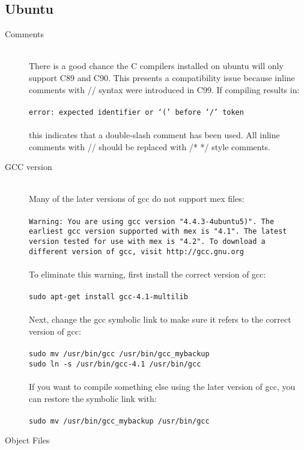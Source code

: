 \documentclass{article}
\begin{document}
\subsection{Ubuntu}
\begin{description}
\item[Comments] \hfill \\
There is a good chance the C compilers installed on ubuntu will only support C89 and C90. This presents a compatibility issue because inline comments with // syntax were introduced in C99. If compiling results in:\\
\\
\texttt{error: expected identifier or ‘(’ before ‘/’ token\\}
\\
this indicates that a double-slash comment has been used. All inline comments with // should be replaced with /*  */ style comments.\\
\item[GCC version] \hfill \\
Many of the later versions of gcc do not support mex files:\\
\\
\texttt{Warning: You are using gcc version "4.4.3-4ubuntu5)". The earliest gcc version supported
with mex is "4.1". The latest version tested for use with mex is "4.2".
To download a different version of gcc, visit http://gcc.gnu.org}\\
\\
To eliminate this warning, first install the correct version of gcc:\\
\\
\texttt{sudo apt-get install gcc-4.1-multilib}\\
\\
Next, change the gcc symbolic link to make sure it refers to the correct version of gcc:\\
\\
\texttt{sudo mv /usr/bin/gcc /usr/bin/gcc\_mybackup}\\
\texttt{sudo ln -s /usr/bin/gcc-4.1 /usr/bin/gcc}\\
\\
If you want to compile something else using the later version of gcc, you can restore the symbolic link with:\\
\\
\texttt{sudo mv /usr/bin/gcc\_mybackup /usr/bin/gcc}\\
\item[Object Files] \hfill \\

\end{description}
\end{document}
